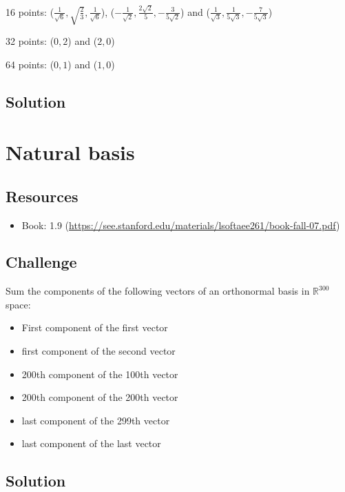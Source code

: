 16 points:
($\displaystyle \frac{1}{\sqrt{6}}, \sqrt{\frac{2}{3}}, \frac{1}{\sqrt{6}}$),
($\displaystyle -\frac{1}{\sqrt{2}},  \frac{2 \sqrt{2}}{5}, -\frac{3}{5 \sqrt{2}}$) and
($\displaystyle \frac{1}{\sqrt{3}},  \frac{1}{5 \sqrt{3}}, -\frac{7}{5 \sqrt{3}}$)

32 points:
($0, 2$) and ($2, 0$)

64 points:
($0, 1$) and ($1, 0$)

\subsection*{Solution}
\six{}


\timebox




\newpage
\section{Natural basis}

\subsection*{Resources}
\begin{itemize}
    \item Book: 1.9 (\url{https://see.stanford.edu/materials/lsoftaee261/book-fall-07.pdf})
\end{itemize}

\subsection*{Challenge}
Sum the components of the following vectors of an orthonormal basis in $\mathbb{R}^{300}$ space:

\begin{itemize}
    \item First component of the first vector
    \item first component of the second vector
    \item 200th component of the 100th vector
    \item 200th component of the 200th vector
    \item last component of the 299th vector
    \item last component of the last vector
\end{itemize}

\subsection*{Solution}
\six{}

